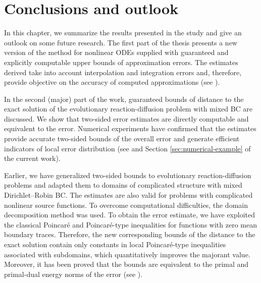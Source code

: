 \chapter{Conclusions and outlook}
\label{chapter:conclusion}

In this chapter, we summarize the results presented in the study and give an outlook 
on some future research.
The first part of the thesis presents a new version of the \PL method for nonlinear 
ODEs supplied with guaranteed and explicitly computable upper bounds of approximation 
errors. The estimates derived take into account interpolation and integration errors 
and, therefore, provide objective on the accuracy of computed approximations 
(see \cite{RefMatculevichNeittaanmakiRepin2013}). 

In the second (major) part of the work, guaranteed bounds of distance to the exact 
solution of the evolutionary reaction-diffusion problem with mixed BC are discussed. We 
show that two-sided error estimates are directly computable and equivalent to the error. 
Numerical experiments have confirmed that the estimates provide accurate two-sided 
bounds of the overall error and generate efficient indicators of local error 
distribution (see \cite{RefMatculevichRepin2014} and Section \ref{sec:numerical-example} 
of the current work). 

Earlier, we have generalized two-sided bounds to evolutionary reaction-diffusion 
problems and adapted them to domains of complicated structure with mixed 
Dirichlet--Robin BC. The estimates are also valid for problems with complicated 
nonlinear source functions. To overcome computational difficulties, the domain 
decomposition method was used. To obtain the error estimate, we have exploited the 
classical Poincar\'{e} and Poincar\'{e}-type inequalities for functions with zero mean 
boundary traces. Therefore, the new corresponding bounds of the distance to the exact 
solution contain only constants in local Poincar\'e-type inequalities associated with 
subdomains, which quantitatively improves the majorant value. Moreover, it has been 
proved that the bounds are equivalent to the primal and primal-dual energy norms of 
the error (see 
\cite{RefMatculevichNeitaanmakiRepin2015, RefMatculevichRepinPoincare2014}).

